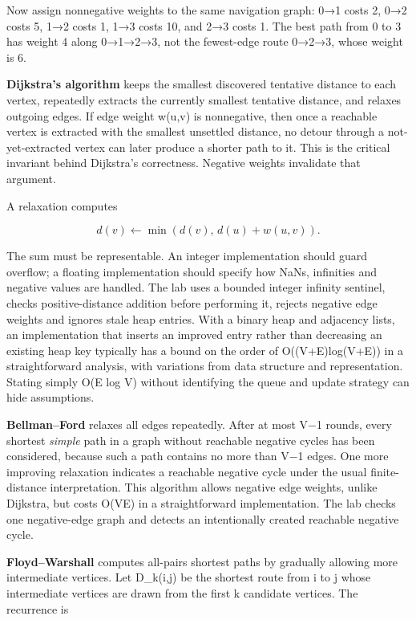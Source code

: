 \hypertarget{05-engine-i-ch008-shortest-paths-the-edge-assumptions-determine-the-proof}{}

Now assign nonnegative weights to the same navigation graph: 0→1 costs 2, 0→2 costs 5, 1→2 costs 1, 1→3 costs 10, and 2→3 costs 1. The best path from 0 to 3 has weight 4 along 0→1→2→3, not the fewest-edge route 0→2→3, whose weight is 6.

\textbf{Dijkstra's algorithm} keeps the smallest discovered tentative distance to each vertex, repeatedly extracts the currently smallest tentative distance, and relaxes outgoing edges. If edge weight w(u,v) is nonnegative, then once a reachable vertex is extracted with the smallest unsettled distance, no detour through a not-yet-extracted vertex can later produce a shorter path to it. This is the critical invariant behind Dijkstra's correctness. Negative weights invalidate that argument.

A relaxation computes

\[
d(v)\leftarrow\min(d(v),\,d(u)+w(u,v)).
\]

The sum must be representable. An integer implementation should guard overflow; a floating implementation should specify how NaNs, infinities and negative values are handled. The lab uses a bounded integer infinity sentinel, checks positive-distance addition before performing it, rejects negative edge weights and ignores stale heap entries. With a binary heap and adjacency lists, an implementation that inserts an improved entry rather than decreasing an existing heap key typically has a bound on the order of O((V+E)log(V+E)) in a straightforward analysis, with variations from data structure and representation. Stating simply O(E log V) without identifying the queue and update strategy can hide assumptions.

\textbf{Bellman--Ford} relaxes all edges repeatedly. After at most V−1 rounds, every shortest \emph{simple} path in a graph without reachable negative cycles has been considered, because such a path contains no more than V−1 edges. One more improving relaxation indicates a reachable negative cycle under the usual finite-distance interpretation. This algorithm allows negative edge weights, unlike Dijkstra, but costs O(VE) in a straightforward implementation. The lab checks one negative-edge graph and detects an intentionally created reachable negative cycle.

\textbf{Floyd--Warshall} computes all-pairs shortest paths by gradually allowing more intermediate vertices. Let D\_k(i,j) be the shortest route from i to j whose intermediate vertices are drawn from the first k candidate vertices. The recurrence is

